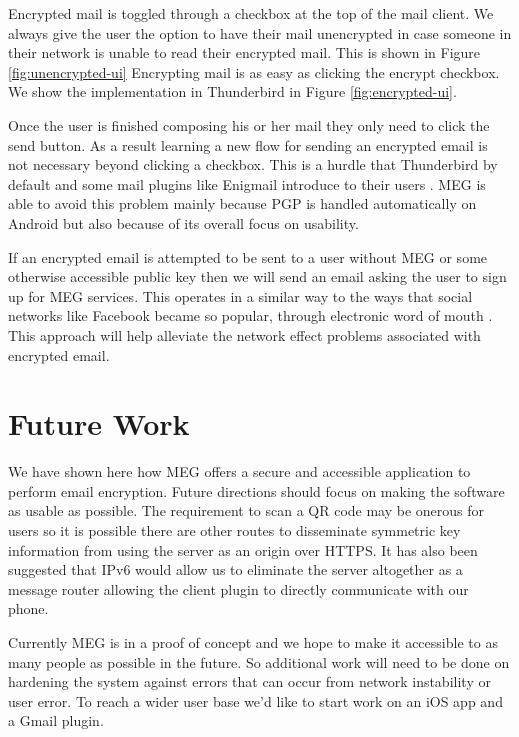 \documentclass[10pt]{article}
\begin{document}
\begin{multicols}{2}
\par Encrypted mail is toggled through a checkbox at the top of the mail client. We always give the user the option to have their mail unencrypted in case someone in their network is unable to read their encrypted mail. This is shown in Figure \ref{fig:unencrypted-ui} Encrypting mail is as easy as clicking the encrypt checkbox. We show the implementation in Thunderbird in Figure \ref{fig:encrypted-ui}.
\par Once the user is finished composing his or her mail they only need to click the send button. As a result learning a new flow for sending an encrypted email is not necessary beyond clicking a checkbox. This is a hurdle that Thunderbird by default and some mail plugins like Enigmail introduce to their users \cite{enigmail-handbook}. MEG is able to avoid this problem mainly because PGP is handled automatically on Android but also because of its overall focus on usability.
\par If an encrypted email is attempted to be sent to a user without MEG or some otherwise accessible public key then we will send an email asking the user to sign up for MEG services. This operates in a similar way to the ways that social networks like Facebook became so popular, through electronic word of mouth \cite{trusov2009effects}. This approach will help alleviate the network effect problems associated with encrypted email.
\section{Future Work}
\par We have shown here how MEG offers a secure and accessible application to perform email encryption. Future directions should focus on making the software as usable as possible. The requirement to scan a QR code may be onerous for users so it is possible there are other routes to disseminate symmetric key information from using the server as an origin over HTTPS. It has also been suggested that IPv6 would allow us to eliminate the server altogether as a message router allowing the client plugin to directly communicate with our phone.
\par Currently MEG is in a proof of concept and we hope to make it accessible to as many people as possible in the future. So additional work will need to be done on hardening the system against errors that can occur from network instability or user error. To reach a wider user base we'd like to start work on an iOS app and a Gmail plugin.


\end{multicols}
\end{document}
